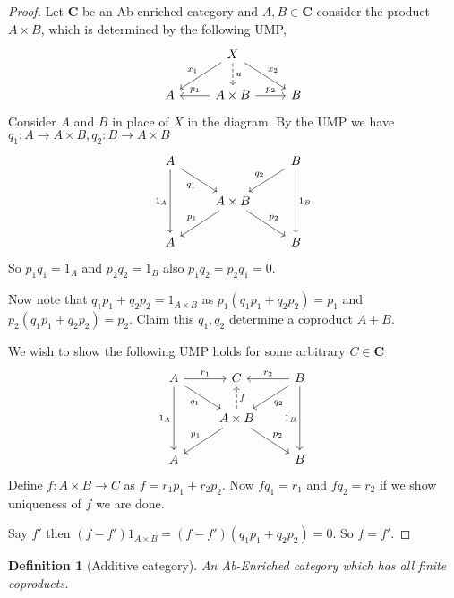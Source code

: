 \documentclass[12pt]{article}
\numberwithin{equation}{section}
\newtheorem{definition}{Definition}[section]
\begin{document}
	\begin{proof}	
		Let $\mathbf{C}$ be an Ab-enriched category and $A,B\in \mathbf{C}$ consider the product $A\times B$, which is determined by the following UMP,
		\[\begin{tikzcd}
			& X \\
			A & A\times B & B
			\arrow["{p_1}"', from=2-2, to=2-1]
			\arrow["{p_2}", from=2-2, to=2-3]
			\arrow["u", dashed, from=1-2, to=2-2]
			\arrow["{x_1}"', from=1-2, to=2-1]
			\arrow["{x_2}", from=1-2, to=2-3]
		\end{tikzcd}\]
		Consider $A$ and $B$ in place of $X $ in the diagram. By the UMP we have $q_1: A \to A\times B, q_2: B \to A\times B$
		\[\begin{tikzcd}
			A && B \\
			& {A\times B} \\
			A && B
			\arrow["{p_1}"', from=2-2, to=3-1]
			\arrow["{p_2}", from=2-2, to=3-3]
			\arrow["{q_2}"', from=1-3, to=2-2]
			\arrow["{q_1}"', from=1-1, to=2-2]
			\arrow["{1_A}"', from=1-1, to=3-1]
			\arrow["{1_B}", from=1-3, to=3-3]
		\end{tikzcd}\]
		So $p_1q_1=1_A$ and $p_2q_2=1_B$ also $p_1q_2=p_2q_1=0$.
		
		Now note that $q_1p_1+q_2p_2=1_{A\times B}$ as $p_1(q_1p_1+q_2p_2)=p_1$ and $p_2(q_1p_1+q_2p_2)=p_2$. Claim this $q_1,q_2$ determine a coproduct $A +B$.
		
		We wish to show the following UMP holds for some arbitrary $C \in \mathbf{C}$
		\[\begin{tikzcd}
			A & C & B \\
			& {A\times B} \\
			A && B
			\arrow["{q_1}"', from=1-1, to=2-2]
			\arrow["{q_2}", from=1-3, to=2-2]
			\arrow["{p_1}"', from=2-2, to=3-1]
			\arrow["{p_2}", from=2-2, to=3-3]
			\arrow["{1_B}"', from=1-3, to=3-3]
			\arrow["{1_A}"', from=1-1, to=3-1]
			\arrow["{r_1}", from=1-1, to=1-2]
			\arrow["{r_2}"', from=1-3, to=1-2]
			\arrow["{f}"',dashed, from=2-2, to=1-2]
		\end{tikzcd}\]
		Define $f: A\times B \to C$ as $f=r_1p_1+r_2p_2$. Now $fq_1=r_1$ and $fq_2=r_2$ if we show uniqueness of $f$ we are done.
		
		Say $f'$ then $(f-f')1_{A \times B}=(f-f')(q_1p_1+q_2p_2)=0$. So $f=f'$.
		
		
	\end{proof}

	
	\begin{definition}[Additive category]
		 An Ab-Enriched category which has all finite coproducts.
	\end{definition}
	
\end{document}
